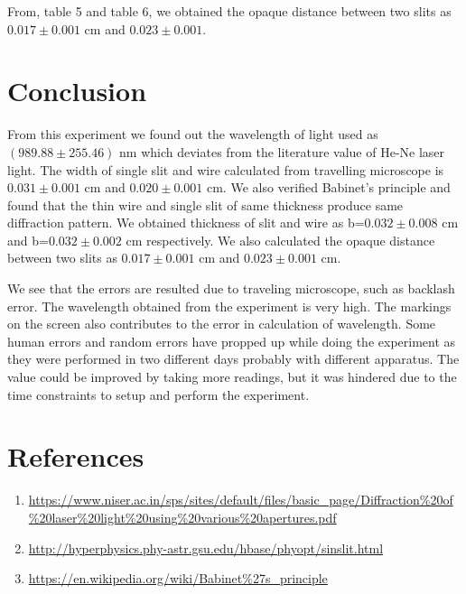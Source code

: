 \documentclass[a4paper, amsfonts, amssymb, amsmath, reprint, showkeys, nofootinbib, twoside]{revtex4-1}
\begin{document}
From, table 5 and table 6, we obtained the opaque distance between two slits as $0.017\pm0.001$ cm and $0.023\pm0.001$. 

\section{Conclusion}
From this experiment we found out the wavelength of light used as $(989.88\pm255.46)$ nm which deviates from the literature value of He-Ne laser light. The width of single slit and wire calculated from travelling microscope is $0.031\pm0.001$ cm and $0.020\pm0.001$ cm. We also verified Babinet's principle and found that the thin wire and single slit of same thickness produce same diffraction pattern. We obtained thickness of slit and wire as b=$0.032\pm0.008$ cm and b=$0.032\pm0.002$ cm respectively. We also calculated the opaque distance between two slits as $0.017\pm0.001$ cm and $0.023\pm0.001$ cm. 

We see that the errors are resulted due to traveling microscope, such as backlash error. The wavelength obtained from the experiment is very high. The markings on the screen also contributes to the error in calculation of wavelength. Some human errors and random errors have propped up while doing the experiment as they were performed in two different days probably with different apparatus. The value could be improved by taking more readings, but it was hindered due to the time constraints to setup and perform the experiment.

\section{References}
\begin{enumerate}
\item{\url{https://www.niser.ac.in/sps/sites/default/files/basic_page/Diffraction%20of%20laser%20light%20using%20various%20apertures.pdf}}
\item{\url{http://hyperphysics.phy-astr.gsu.edu/hbase/phyopt/sinslit.html}}
\item{\url{https://en.wikipedia.org/wiki/Babinet%27s_principle}}
\end{enumerate}
\end{document}
